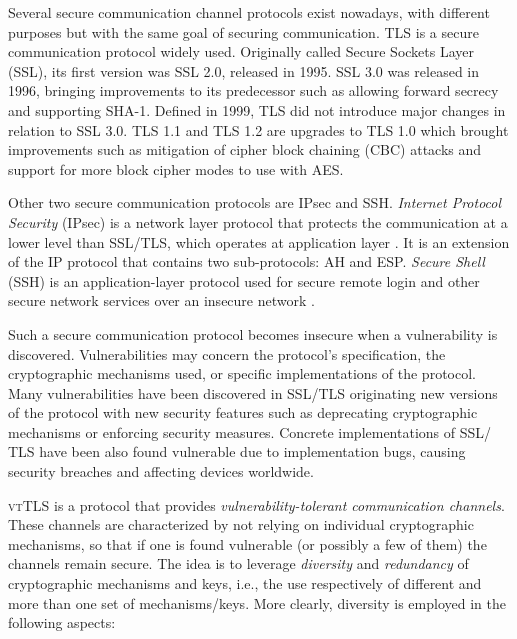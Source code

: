 \documentclass{sig-alternate-05-2015}
\begin{document}
Several secure communication channel protocols exist no\-wadays,  with different purposes but with the same goal of securing  communication.
%
TLS is a secure communication protocol widely used. Originally called Secure Sockets Layer (SSL), its first  version was SSL 2.0, released in 1995. SSL 3.0 was released in 1996, bringing improvements to its predecessor such as allowing forward secrecy and supporting SHA-1.
Defined in 1999, TLS did not introduce major changes in relation to SSL 3.0.
TLS 1.1 and TLS 1.2 are upgrades to TLS 1.0 which brought improvements such as mitigation of cipher block chaining (CBC) attacks and support for more block cipher modes  to use with AES.

Other two secure communication protocols are IPsec and SSH.
\textit{Internet Protocol Security} (IPsec) is a network layer protocol that protects the communication at a lower level than SSL/TLS, which operates at application layer \cite{IPsec}. It is an extension of the IP protocol that contains two sub-protocols: AH and ESP.
%
\textit{Secure Shell} (SSH) is an application-layer protocol used for secure remote login and other secure network services over an insecure network \cite{SSH}.

Such a secure communication protocol becomes insecure when a vulnerability is discovered. Vulnerabilities may concern the protocol's specification, the cryptographic mechanisms used, or specific implementations of the protocol. Many vulnerabilities have been discovered in SSL/TLS originating new versions of the protocol with new security features such as deprecating cryptographic mechanisms or enforcing security measures.
Concrete implementations of SSL/ TLS have been also found vulnerable due to implementation bugs, causing  security breaches and affecting devices worldwide.

\textsc{vtTLS} is a protocol that provides \emph{vulnerability-tolerant communication channels}. These channels are characterized by not relying on individual cryptographic mechanisms, so that if one is found vulnerable (or possibly a few of them) the channels remain secure. The idea is to leverage  \textit{diversity}  and \textit{redundancy} of cryptographic mechanisms and keys, i.e., the use respectively of different and more than one set of mechanisms/keys. More clearly, diversity is employed in the following aspects:
\end{document}
